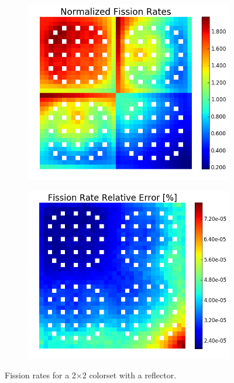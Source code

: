 \begin{figure}[h!]
\centering
\begin{subfigure}{0.5\textwidth}
  \centering
  \includegraphics[width=\linewidth]{figures/benchmarks/fission-rates/fiss-mean-reflector}
  \caption{}
  \label{fig:chap7-fiss-rate-mean-reflector}
\end{subfigure}%
\begin{subfigure}{0.5\textwidth}
  \centering
  \includegraphics[width=\linewidth]{figures/benchmarks/fission-rates/fiss-rel-err-reflector}
  \caption{}
  \label{fig:chap7-fiss-rate-rel-err-reflector}
\end{subfigure}%
\caption[Fission rates for a 2$\times$2 colorset with a reflector]{Fission rates for a 2$\times$2 colorset with a reflector.}
\label{fig:chap7-fiss-rates-2x2}
\end{figure}

